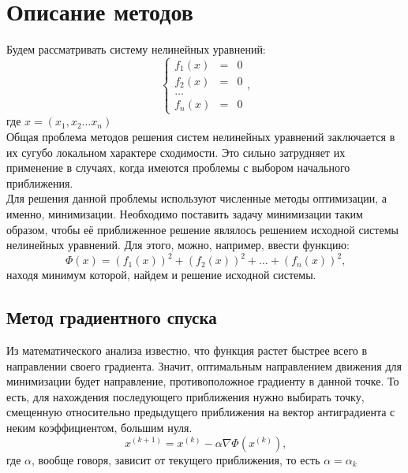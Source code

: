 \documentclass[a4paper, 12pt]{article}
\begin{document}
\section*{Описание методов}
Будем рассматривать систему нелинейных уравнений:
\[
\left\{
\begin{array}{ccc}	f_1(x) & = &  0\\
	f_2(x) & = &  0\\
	\ldots \\
	f_n(x) & = &  0 
\end{array}
\text{,}
\right.
\]
где $x = (x_1, x_2 \ldots x_n)$\\
Общая проблема методов решения систем нелинейных уравнений заключается в их сугубо локальном
характере сходимости. Это сильно затрудняет их применение в случаях, когда имеются проблемы с 
выбором начального приближения.\\
Для решения данной проблемы используют численные методы оптимизации, а именно, минимизации.
Необходимо поставить задачу минимизации таким образом, чтобы её приближенное решение являлось решением 
исходной системы нелинейных уравнений. Для этого, можно, например, ввести функцию:
\begin{equation*}
	\Phi(x) = (f_1(x))^2 + (f_2(x))^2 + \ldots + (f_n(x))^2 \text{,}
\end{equation*}
находя минимум которой, найдем и решение исходной системы. 

\subsection*{Метод градиентного спуска}
Из математического анализа известно, что функция растет быстрее всего в направлении
своего градиента. Значит, оптимальным направлением движения для минимизации будет направление, 
противоположное градиенту в данной точке. То есть, 
для нахождения последующего приближения нужно выбирать точку, смещенную относительно предыдущего
приближения на вектор антиградиента с неким коэффициентом, большим нуля.
\begin{equation}
	x^{(k+1)} = x^{(k)} - \alpha \nabla \Phi(x^{(k)}) \text{,}
\end{equation}
где $\alpha$, вообще говоря, зависит от текущего приближения, то есть $\alpha = \alpha_k$
\end{document}
